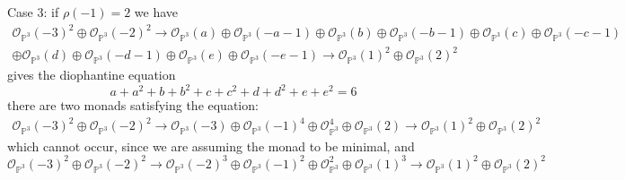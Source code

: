 \documentclass[
	oldfontcommands,
	sumario=abnt-6027-2012,
	12pt,			%
	openright,		%
	oneside,		%
	a4paper,		%
	english,		%
	brazil			%
	]{imecc-unicamp}
\begin{document}
\begin{example}
\begin{equation}
\end{equation}
Case 3: if $\rho(-1)=2$ we have
\begin{equation}
\begin{split}
\mathcal{O}_{\mathbb{P}^3}(-3)^{2} \oplus \mathcal{O}_{\mathbb{P}^3}(-2)^2 \to  \mathcal{O}_{\mathbb{P}^3}(a)\oplus\mathcal{O}_{\mathbb{P}^3}(-a-1)\oplus\mathcal{O}_{\mathbb{P}^3}(b)\oplus\mathcal{O}_{\mathbb{P}^3}(-b-1)\oplus \mathcal{O}_{\mathbb{P}^3}(c) \oplus \mathcal{O}_{\mathbb{P}^3}(-c-1) \\ \oplus \mathcal{O}_{\mathbb{P}^3}(d) \oplus \mathcal{O}_{\mathbb{P}^3}(-d-1) \oplus \mathcal{O}_{\mathbb{P}^3}(e) \oplus \mathcal{O}_{\mathbb{P}^3}(-e-1) \to  \mathcal{O}_{\mathbb{P}^3}(1)^2 \oplus \mathcal{O}_{\mathbb{P}^3}(2)^{2}
\end{split}
\end{equation}
gives the diophantine equation
\begin{equation}
a+a^2+b+b^2+c+c^2+d+d^2+e+e^2=6
\end{equation}
there are two monads satisfying the equation:
\begin{equation}
\begin{split}
\mathcal{O}_{\mathbb{P}^3}(-3)^{2} \oplus \mathcal{O}_{\mathbb{P}^3}(-2)^2 \to  \mathcal{O}_{\mathbb{P}^3}(-3)\oplus\mathcal{O}_{\mathbb{P}^3}(-1)^4\oplus\mathcal{O}_{\mathbb{P}^3}^4\oplus\mathcal{O}_{\mathbb{P}^3}(2)\to  \mathcal{O}_{\mathbb{P}^3}(1)^2 \oplus \mathcal{O}_{\mathbb{P}^3}(2)^{2}
\end{split}
\end{equation}
which cannot occur, since we are assuming the monad to be minimal, and
\begin{equation}
\mathcal{O}_{\mathbb{P}^3}(-3)^{2} \oplus \mathcal{O}_{\mathbb{P}^3}(-2)^2 \to  \mathcal{O}_{\mathbb{P}^3}(-2)^3\oplus\mathcal{O}_{\mathbb{P}^3}(-1)^2\oplus\mathcal{O}_{\mathbb{P}^3}^2\oplus\mathcal{O}_{\mathbb{P}^3}(1)^3\to  \mathcal{O}_{\mathbb{P}^3}(1)^2 \oplus \mathcal{O}_{\mathbb{P}^3}(2)^{2}
\end{equation}
\end{example}
\end{document}
